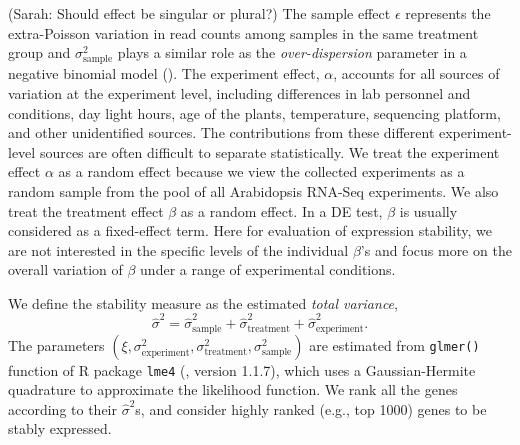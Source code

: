 	
	(Sarah: Should effect be singular or plural?)
	The sample effect $\epsilon$ represents the
	extra-Poisson variation in read counts among samples in the same treatment
	group and $\sigma_{\text{sample}}^2$ plays a similar role as the
	\textit{over-dispersion} parameter in a negative binomial model
	(\citealt{anders2010differential,di2011nbp}). 
	The experiment effect, $\alpha$, accounts for all sources of variation at
	the experiment level, including differences in lab personnel and conditions,
	day light hours, age of the plants, temperature, sequencing platform, and
	other unidentified sources. The contributions from these different
	experiment-level sources are often difficult to separate statistically. We
	treat the experiment effect $\alpha$ as a random effect because we view the
	collected experiments as a random sample from the pool of all Arabidopsis
	RNA-Seq experiments. We also treat the treatment effect $\beta$ as a random
	effect.  In a DE test, $\beta$ is usually considered as a fixed-effect term.
	Here for evaluation of expression stability, we are not interested in the
	specific levels of the individual $\beta$'s and focus more on the overall
	variation of $\beta$ under a range of experimental conditions.
	
	
	We define the stability measure as the estimated \textit{total variance},
	\begin{equation}\label{eq:totalVariance}
		\hat \sigma^2 =\hat\sigma_{\text{sample}}^2+ \hat\sigma_{\text{treatment}}^2+ \hat\sigma_{\text{experiment}}^2.
	\end{equation}
	The parameters $(\xi, \sigma_{\text{experiment}}^2,
	\sigma_{\text{treatment}}^2, \sigma_{\text{sample}}^2)$ are estimated from
	\verb|glmer()| function of R package \verb"lme4" (\cite{bates2012lme4},
	version 1.1.7), which uses a Gaussian-Hermite quadrature to approximate the
	likelihood function. 
	We rank all the genes according to their $\hat\sigma^2$s, and consider highly
	ranked (e.g., top 1000) genes to be stably expressed. 
	
